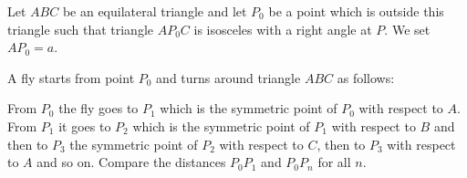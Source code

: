 \documentclass[varwidth]{standalone}
\begin{document}
    Let $ABC$ be an equilateral triangle and let $P_0$ be a point which is outside this triangle such that triangle $AP_0 C$ is isosceles with a right angle at $P$. We set $AP_0 = a$.

    A fly starts from point $P_0$ and turns around triangle $ABC$ as follows:

    From $P_0$ the fly goes to $P_1$ which is the symmetric point of $P_0$ with respect to $A$. From $P_1$ it goes to $P_2$ which is the symmetric point of $P_1$ with respect to $B$ and then to $P_3$ the symmetric point of $P_2$ with respect to $C$, then to $P_3$ with respect to $A$ and so on. Compare the distances $P_0 P_1$ and $P_0 P_n$ for all $n$.
\end{document}
